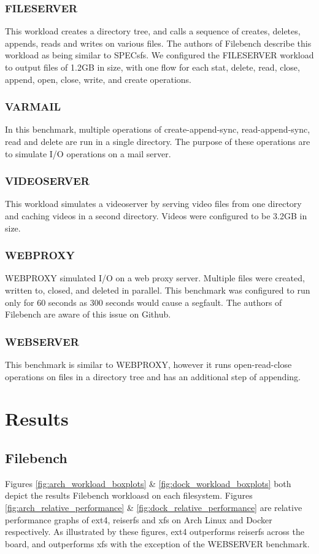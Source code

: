 \documentclass[letterpaper,twocolumn,10pt]{article}
\begin{document}
\subsubsection{FILESERVER}
This workload creates a directory tree, and calls a sequence of creates, deletes, appends, reads and writes on various files. The authors of Filebench describe this workload as being similar to SPECsfs. We configured the FILESERVER workload to output files of 1.2GB in size, with one flow for each stat, delete, read, close, append, open, close, write, and create operations.

\subsubsection{VARMAIL}
In this benchmark, multiple operations of create-append-sync, read-append-sync, read and delete are run in a single directory. The purpose of these operations are to simulate I/O operations on a mail server. 

\subsubsection{VIDEOSERVER}
This workload simulates a videoserver by serving video files from one directory and caching videos in a second directory. Videos were configured to be 3.2GB in size.

\subsubsection{WEBPROXY}
WEBPROXY simulated I/O on a web proxy server. Multiple files were created, written to, closed, and deleted in parallel. This benchmark was configured to run only for 60 seconds as 300 seconds would cause a segfault. The authors of Filebench are aware of this issue on Github.

\subsubsection{WEBSERVER}
This benchmark is similar to WEBPROXY, however it runs open-read-close operations on files in a directory tree and has an additional step of appending. 

\section{Results}
\subsection{Filebench}
Figures \ref{fig:arch_workload_boxplots} \& \ref{fig:dock_workload_boxplots} both depict the results Filebench workloasd on each filesystem. Figures \ref{fig:arch_relative_performance} \& \ref{fig:dock_relative_performance} are relative performance graphs of ext4, reiserfs and xfs on Arch Linux and Docker respectively. As illustrated by these figures, ext4 outperforms reiserfs across the board, and outperforms xfs with the exception of the WEBSERVER benchmark. 
\end{document}

